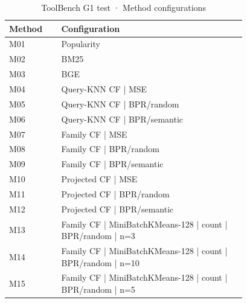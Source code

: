 \begin{table}
\caption{ToolBench G1 test · Method configurations}
\label{tab:ToolBench-G1-test-comparison-comparison-methods}
\begin{tabular}{lp{0.78\linewidth}}
\toprule
Method & Configuration \\
\midrule
M01 & Popularity \\
M02 & BM25 \\
M03 & BGE \\
M04 & Query-KNN CF | MSE \\
M05 & Query-KNN CF | BPR/random \\
M06 & Query-KNN CF | BPR/semantic \\
M07 & Family CF | MSE \\
M08 & Family CF | BPR/random \\
M09 & Family CF | BPR/semantic \\
M10 & Projected CF | MSE \\
M11 & Projected CF | BPR/random \\
M12 & Projected CF | BPR/semantic \\
M13 & Family CF | MiniBatchKMeans-128 | count | BPR/random | n=3 \\
M14 & Family CF | MiniBatchKMeans-128 | count | BPR/random | n=10 \\
M15 & Family CF | MiniBatchKMeans-128 | count | BPR/random | n=5 \\
\bottomrule
\end{tabular}
\end{table}
